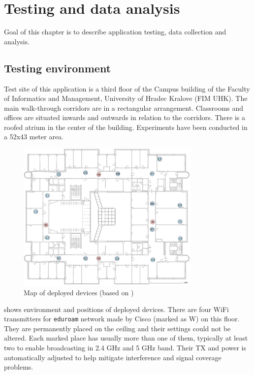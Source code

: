 \chapter{Testing and data analysis}\label{sec:TestingAndDataAnalysis}
Goal of this chapter is to describe application testing, data collection and analysis.

\section{Testing environment}\label{sec:TestingEnvironment}
Test site of this application is a third floor of the Campus building of the Faculty of Informatics and Management, University of Hradec Kralove (FIM UHK). The main walk-through corridors are in a rectangular arrangement. Classrooms and offices are situated inwards and outwards in relation to the corridors. There is a roofed atrium in the center of the building. Experiments have been conducted in a 52x43 meter area.

\begin{figure}[H]
	\begin{centering}
		\includegraphics[width=0.8\textwidth]{img/j3np}
		\par\end{centering}
	\caption{Map of deployed devices (based on \cite{IILUBLEB})}
	\label{fig01c06}
\end{figure}

 shows environment and positions of deployed devices. There are four WiFi transmitters for \verb|eduroam| network made by Cisco (marked as W) on this floor. They are permanently placed on the ceiling and their settings could not be altered. Each marked place has usually more than one of them, typically at least two to enable broadcasting in 2.4 GHz and 5 GHz band. Their TX and power is automatically adjusted to help mitigate interference and signal coverage problems.


